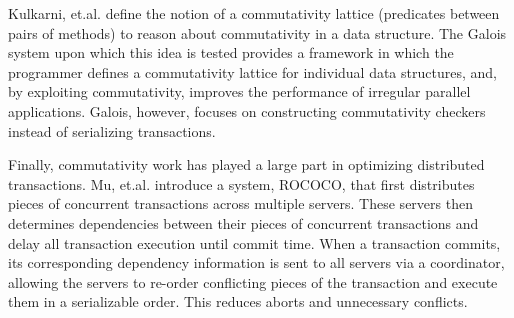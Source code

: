 Kulkarni, et.al.\cite{galois} define the notion of a commutativity lattice (predicates between pairs of methods) to reason about commutativity in a data structure. The Galois system upon which this idea is tested provides a framework in which the programmer defines a commutativity lattice for individual data structures, and, by exploiting commutativity, improves the performance of irregular parallel applications. Galois, however, focuses on constructing commutativity checkers instead of serializing transactions.

Finally, commutativity work has played a large part in optimizing distributed transactions. Mu, et.al.\cite{distributed} introduce a system, ROCOCO, that first distributes pieces of concurrent transactions across multiple servers. These servers then determines dependencies between their pieces of concurrent transactions and delay all transaction execution until commit time. When a transaction commits, its corresponding dependency information is sent to all servers via a coordinator, allowing the servers to re-order conflicting pieces of the transaction and execute them in a serializable order. This reduces aborts and unnecessary conflicts.
